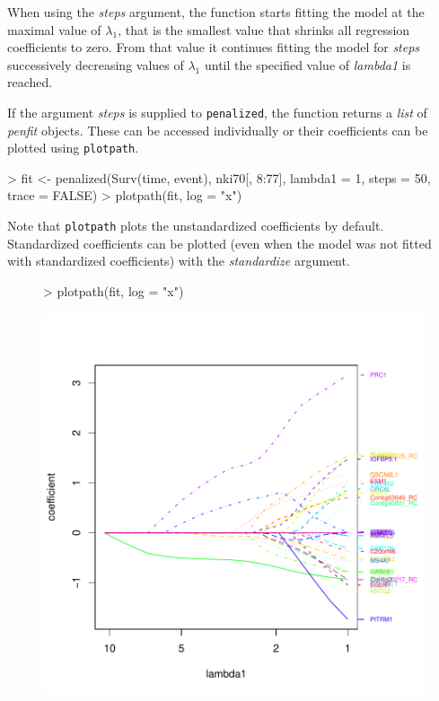 \documentclass[a4paper]{article}
\newcommand{\Rfunction}[1]{{\texttt{#1}}}
\newcommand{\Rclass}[1]{{\textit{#1}}}
\newcommand{\Rfunarg}[1]{{\textit{#1}}}
\begin{document}
When using the \Rfunarg{steps} argument, the function starts fitting the model at the maximal value of $\lambda_1$, that is the smallest value that shrinks all regression coefficients to zero. From that value it continues fitting the model for \Rfunarg{steps} successively decreasing values of $\lambda_1$ until the specified value of \Rfunarg{lambda1} is reached.

If the argument \Rfunarg{steps} is supplied to \Rfunction{penalized}, the function returns a \Rclass{list} of \Rclass{penfit} objects. These can be accessed individually or their coefficients can be plotted using \Rfunction{plotpath}.

\begin{Schunk}
\begin{Sinput}
> fit <- penalized(Surv(time, event), nki70[, 8:77], lambda1 = 1, 
      steps = 50, trace = FALSE)
> plotpath(fit, log = "x")
\end{Sinput}
\end{Schunk}

Note that \Rfunction{plotpath} plots the unstandardized coefficients by default. Standardized coefficients can be plotted (even when the model was not fitted with standardized coefficients) with the \Rfunarg{standardize} argument.

\begin{figure}
\begin{Schunk}
\begin{Sinput}
> plotpath(fit, log = "x")
\end{Sinput}
\end{Schunk}
\includegraphics{penalized-stepsplot}
\end{figure}
\end{document}
